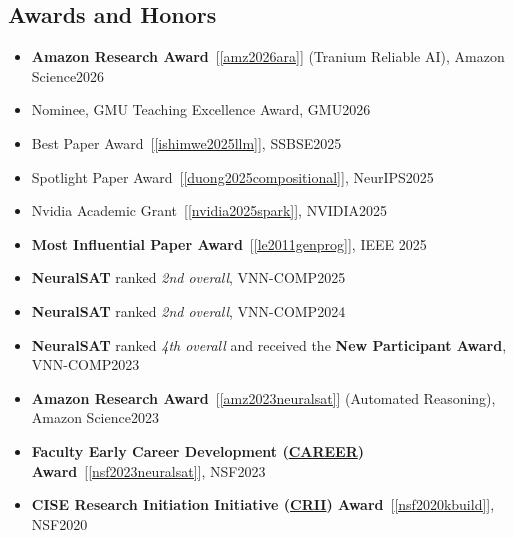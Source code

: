 \documentclass[11pt]{article}
\begin{document}
\subsection{Awards and Honors}

\begin{itemize}
    \item \textbf{Amazon Research Award}~[\ref{amz2026ara}] (Tranium Reliable AI), Amazon Science\hfill 2026    
    \item Nominee, GMU Teaching Excellence Award, GMU\hfill 2026
    \item Best Paper Award~[\ref{ishimwe2025llm}], SSBSE\hfill 2025        
    \item Spotlight Paper Award~[\ref{duong2025compositional}], NeurIPS\hfill 2025
    \item Nvidia Academic Grant~[\ref{nvidia2025spark}], NVIDIA\hfill 2025    
    \item \textbf{Most Influential Paper Award}~[\ref{le2011genprog}], IEEE \hfill 2025
    \item \textbf{NeuralSAT} ranked \emph{2nd overall}, VNN-COMP\hfill 2025
    \item \textbf{NeuralSAT} ranked \emph{2nd overall}, VNN-COMP\hfill 2024
    \item \textbf{NeuralSAT} ranked \emph{4th overall} and received the \textbf{New Participant Award}, VNN-COMP\hfill 2023
    \item \textbf{Amazon Research Award}~[\ref{amz2023neuralsat}] (Automated Reasoning), Amazon Science\hfill 2023
    \item \textbf{Faculty Early Career Development (\href{https://www.nsf.gov/awardsearch/showAward?AWD_ID=2238133}{CAREER}) Award}~[\ref{nsf2023neuralsat}], NSF\hfill 2023
    
    \item \textbf{CISE Research Initiation Initiative (\href{https://www.nsf.gov/awardsearch/showAward?AWD_ID=1948536}{CRII}) Award}~[\ref{nsf2020kbuild}], NSF\hfill 2020
    

\end{itemize}
\end{document}
